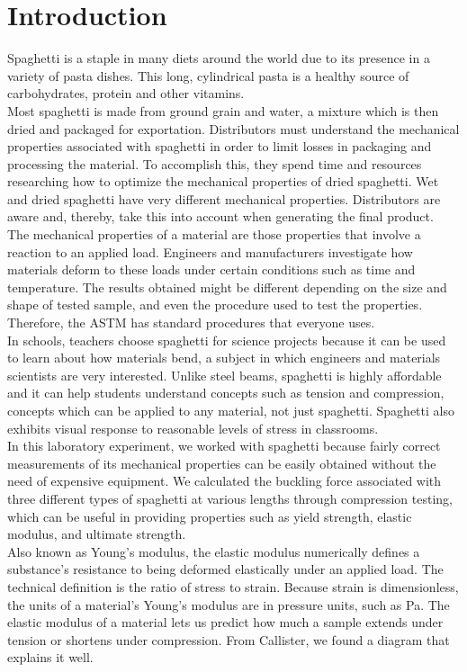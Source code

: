 \documentclass[12pt]{article}
\newcommand\tab[1][1.5cm]{\hspace*{#1}}
\begin{document}
\section{Introduction}
\tab Spaghetti is a staple in many diets around the world due to its presence in a variety of pasta dishes. This long, cylindrical pasta is a healthy source of carbohydrates, protein and other vitamins.\\
\tab Most spaghetti is made from ground grain and water, a mixture which is then dried and packaged for exportation. Distributors must understand the mechanical properties associated with spaghetti in order to limit losses in packaging and processing the material. To accomplish this, they spend time and resources researching how to optimize the mechanical properties of dried spaghetti. Wet and dried spaghetti have very different mechanical properties. Distributors are aware and, thereby, take this into account when generating the final product.\\
\tab The mechanical properties of a material are those properties that involve a reaction to an applied load. Engineers and manufacturers investigate how materials deform to these loads under certain conditions such as time and temperature. The results obtained might be different depending on the size and shape of tested sample, and even the procedure used to test the properties. Therefore, the ASTM has standard procedures that everyone uses.\\
\tab In schools, teachers choose spaghetti for science projects because it can be used to learn about how materials bend, a subject in which engineers and materials scientists are very interested. Unlike steel beams, spaghetti is highly affordable and it can help students understand concepts such as tension and compression, concepts which can be applied to any material, not just spaghetti. Spaghetti also exhibits visual response to reasonable levels of stress in classrooms.\\
\tab In this laboratory experiment, we worked with spaghetti because fairly correct measurements of its mechanical properties can be easily obtained without the need of expensive equipment. We calculated the buckling force associated with three different types of spaghetti at various lengths through compression testing, which can be useful in providing properties such as yield strength, elastic modulus, and ultimate strength.\\
\tab Also known as Young's modulus, the elastic modulus numerically defines a substance's resistance to being deformed elastically under an applied load. The technical definition is the ratio of stress to strain. Because strain is dimensionless, the units of a material's Young's modulus are in pressure units, such as Pa. The elastic modulus of a material lets us predict how much a sample extends under tension or shortens under compression. From Callister, we found a diagram that explains it well.\\
\end{document}
